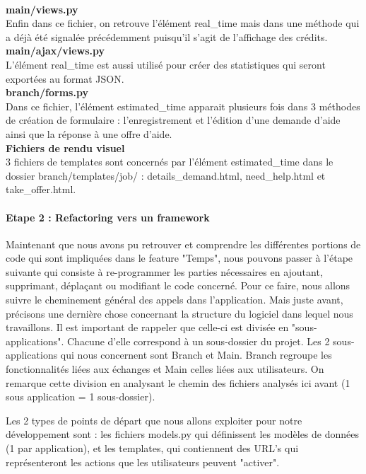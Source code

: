 \\
\textbf{main/views.py}
\\%
Enfin dans ce fichier,  on retrouve l'élément real\_time mais dans une méthode qui a déjà été signalée précédemment puisqu'il s'agit de l'affichage des crédits.
\\
\textbf{main/ajax/views.py}
\\%
L'élément real\_time est aussi utilisé pour créer des statistiques qui seront exportées au format JSON.
\\
\textbf{branch/forms.py}
\\%
Dans ce fichier,   l'élément estimated\_time apparait plusieurs fois dans 3 méthodes de création de formulaire : l'enregistrement et l'édition d'une demande d'aide ainsi que la réponse à une offre d'aide.
\\
\textbf{Fichiers de rendu visuel}
\\%
3 fichiers de templates sont concernés par l'élément estimated\_time dans le dossier branch/templates/job/ : details\_demand.html,  need\_help.html et take\_offer.html.

\paragraph{Etape 2 : Refactoring vers un framework}

Maintenant que nous avons pu retrouver et comprendre les différentes portions de code qui sont impliquées dans le feature "Temps",  nous pouvons passer à l'étape suivante qui consiste à re-programmer les parties nécessaires en ajoutant,  supprimant,  déplaçant ou modifiant le code concerné.  Pour ce faire,  nous allons suivre le cheminement général des appels dans l'application.  Mais juste avant,  précisons une dernière chose concernant la structure du logiciel dans lequel nous travaillons.  Il est important de rappeler que celle-ci est divisée en "sous-applications".  Chacune d'elle correspond à un sous-dossier du projet.  Les 2 sous-applications qui nous concernent sont Branch et Main.  Branch regroupe les fonctionnalités liées aux échanges et Main celles liées aux utilisateurs.  On remarque cette division en analysant le chemin des fichiers analysés ici avant (1 sous application = 1 sous-dossier).  

Les 2 types de points de départ que nous allons exploiter pour notre développement sont : les fichiers models.py qui définissent les modèles de données (1 par application),  et les templates,  qui contiennent des URL's qui représenteront les actions que les utilisateurs peuvent "activer".  

